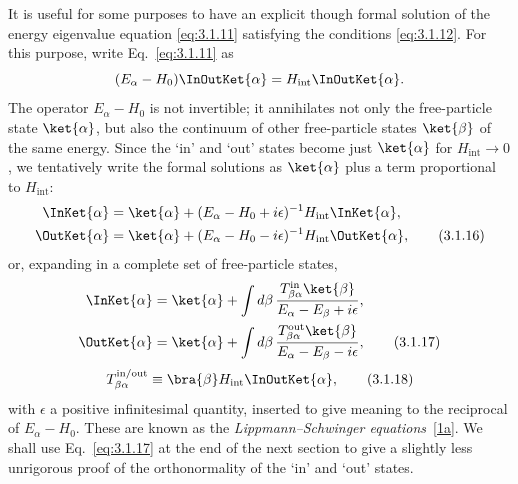 It is useful for some purposes to have an explicit though formal solution of
the energy eigenvalue equation \eqref{eq:3.1.11} satisfying the conditions \eqref{eq:3.1.12}.
For this purpose, write Eq.~\eqref{eq:3.1.11} as
\[
(E_\alpha-H_0)\InOutKet{\alpha}
=H_{\mathrm{int}}\InOutKet{\alpha}.
\]
The operator $E_\alpha-H_0$ is not invertible; it annihilates not only the
free-particle state $\ket{\alpha}$, but also the continuum of other
free-particle states $\ket{\beta}$ of the same energy. Since the `in' and
`out' states become just $\ket{\alpha}$ for $H_{\mathrm{int}}\to0$, we
tentatively write the formal solutions as $\ket{\alpha}$ plus a term
proportional to $H_{\mathrm{int}}$:
\begin{align}
\InKet{\alpha}
&=\ket{\alpha}+(E_\alpha-H_0+i\epsilon)^{-1}
H_{\mathrm{int}}\InKet{\alpha},
\notag\\
\OutKet{\alpha}
&=\ket{\alpha}+(E_\alpha-H_0-i\epsilon)^{-1}
H_{\mathrm{int}}\OutKet{\alpha},
\tag{3.1.16}\label{eq:3.1.16}
\end{align}
or, expanding in a complete set of free-particle states,
\begin{align}
\InKet{\alpha}
&=\ket{\alpha}+\int d\beta\,
\frac{T^{\mathrm{in}}_{\beta\alpha}\ket{\beta}}
{E_\alpha-E_\beta+i\epsilon},
\notag\\
\OutKet{\alpha}
&=\ket{\alpha}+\int d\beta\,
\frac{T^{\mathrm{out}}_{\beta\alpha}\ket{\beta}}
{E_\alpha-E_\beta-i\epsilon},
\tag{3.1.17}\label{eq:3.1.17}
\end{align}
\begin{equation}
T^{\mathrm{in/out}}_{\beta\alpha}
\equiv\bra{\beta}H_{\mathrm{int}}\InOutKet{\alpha},
\tag{3.1.18}\label{eq:3.1.18}
\end{equation}
with $\epsilon$ a positive infinitesimal quantity, inserted to give meaning to
the reciprocal of $E_\alpha-H_0$. These are known as the
\textit{Lippmann--Schwinger equations}~\hyperref[ref:3.1a]{[1a]}. We shall use Eq.~\eqref{eq:3.1.17} at the
end of the next section to give a slightly less unrigorous proof of the
orthonormality of the `in' and `out' states.

